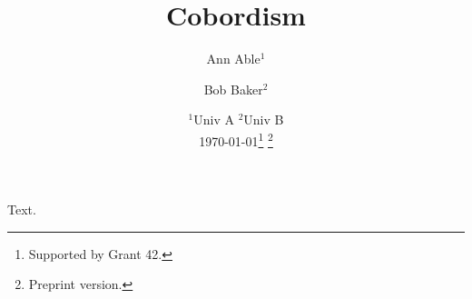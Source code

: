 \documentclass{article}
\title{Cobordism}
\author{Ann Able$^1$ \and Bob Baker$^2$}
\date{$^1$Univ A \qquad $^2$Univ B\\ \today\thanks{Supported by Grant 42.} {\small\footnote{Preprint version.}}}
\begin{document}
\maketitle
Text.
\end{document}
